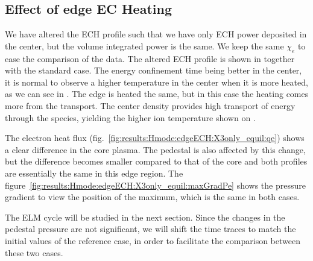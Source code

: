 \subsection{Effect of edge EC Heating}\label{sec:results:Hmode:edgeECH}
We have altered the ECH profile such that we have only ECH power deposited in the center, but the volume integrated power is the same. We keep the same $\chi_e$ to ease the comparison of the data. The altered ECH profile is shown in  together with the standard case. The energy confinement time being better in the center, it is normal to observe a higher temperature in the center when it is more heated, as we can see in . The edge is heated the same, but in this case the heating comes more from the transport. The center density provides high transport of energy through the species, yielding the higher ion temperature shown on .


The electron heat flux (fig.~\ref{fig:results:Hmode:edgeECH:X3only_equil:qe}) shows a clear difference in the core plasma. The pedestal is also affected by this change, but the difference becomes smaller compared to that of the core and both profiles are essentially the same in this edge region. The figure~\ref{fig:results:Hmode:edgeECH:X3only_equil:maxGradPe} shows the pressure gradient to view the position of the maximum, which is the same in both cases.

The ELM cycle will be studied in the next section. Since the changes in the pedestal pressure are not significant, we will shift the time traces to match the initial values of the reference case, in order to facilitate the comparison between these two cases.

